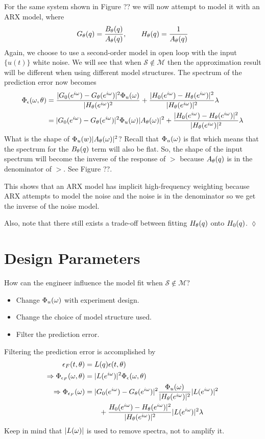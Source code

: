 \begin{example}
For the same system shown in Figure ?? we will now attempt to model it with an ARX model, where
$$G_\theta(q)=\frac{B_\theta(q)}{A_\theta(q)}, \qquad H_\theta(q)=\frac{1}{A_\theta(q)}$$
Again, we choose to use a second-order model in open loop with the input $\{u(t)\}$ white noise. We will see that when $\mathcal{S}\notin\mathcal{M}$ then the approximation result will be different when using different model structures. The spectrum of the prediction error now becomes
\begin{align*}
\Phi_\epsilon(\omega,\theta) &= \frac{|G_0(e^{i\omega})-G_\theta(e^{i\omega})|^2\Phi_u(\omega)}{|H_\theta(e^{i\omega})^2} + \frac{|H_0(e^{i\omega})-H_\theta(e^{i\omega})|^2}{|H_\theta(e^{i\omega})|^2}\lambda \\
&= |G_0(e^{i\omega})-G_\theta(e^{i\omega})|^2\Phi_u(\omega)|A_\theta(\omega)|^2 + \frac{|H_0(e^{i\omega})-H_\theta(e^{i\omega})|^2}{|H_\theta(e^{i\omega})|^2}\lambda
\end{align*}
What is the shape of $\Phi_u(w)|A_\theta(\omega)|^2$? Recall that $\Phi_u(\omega)$ is flat which means that the spectrum for the $B_\theta(q)$ term will also be flat. So, the shape of the input spectrum will become the inverse of the response of $\gt$ because $A_\theta(q)$ is in the denominator of $\gt$. See Figure ??.

This shows that an ARX model has implicit high-frequency weighting because ARX attempts to model the noise and the noise is in the denominator so we get the inverse of the noise model.

Also, note that there still exists a trade-off between fitting $H_\theta(q)$ onto $H_0(q)$.
$\lozenge$
\end{example}

\section{Design Parameters}
\label{sec:16dp}
How can the engineer influence the model fit when $\mathcal{S}\notin\mathcal{M}$?
\begin{itemize}
\item Change $\Phi_u(\omega)$ with experiment design.
\item Change the choice of model structure used.
\item Filter the prediction error.
\end{itemize}
Filtering the prediction error is accomplished by
\begin{align*}
\epsilon_F(t,\theta) &= L(q)\epsilon(t,\theta) \\
\Rightarrow \Phi_{\epsilon_F}(\omega,\theta) &= |L(e^{i\omega})|^2\Phi_\epsilon(\omega,\theta) \\
\Rightarrow \Phi_{\epsilon_F}(\omega) &= |G_0(e^{i\omega}) - G_\theta(e^{i\omega})|^2\frac{\Phi_u(\omega)}{|H_\theta(e^{i\omega})|^2}|L(e^{i\omega})|^2 \\
&\qquad + \frac{H_0(e^{i\omega}) - H_\theta(e^{i\omega})|^2}{|H_\theta(e^{i\omega})|^2}|L(e^{i\omega})|^2\lambda
\end{align*}
Keep in mind that $|L(\omega)|$ is used to remove spectra, not to amplify it.

